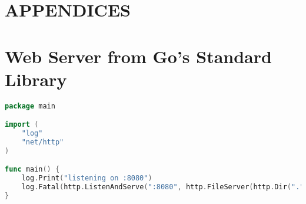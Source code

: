 \chapter*{APPENDICES}

\begingroup\let\clearpage\relax
\chapter{Web Server from Go's Standard Library}
\label{chap:appendix_golangwebserver}
\endgroup

\begin{lstlisting}[language=Go]
package main

import (
    "log"
    "net/http"
)

func main() {
    log.Print("listening on :8080")
    log.Fatal(http.ListenAndServe(":8080", http.FileServer(http.Dir("."))))
}
\end{lstlisting}

